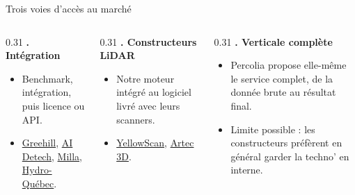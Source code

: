 \documentclass[A4,svgnames,10pt,aspectratio=169,usepdftitle=false]{beamer}
\begin{document}
\begin{frame}{Trois voies d'accès au marché}
    \begin{columns}[T]
        \begin{column}{0.31\textwidth}
            \textbf{. Intégration}
            \begin{itemize}
                \item Benchmark, intégration, puis licence ou API.
                \item \href{https://www.greehill.com/}{Greehill}, \href{https://www.linkedin.com/company/ai-detech}{AI Detech}, \href{https://www.milla-group.com/}{Milla}, \href{https://www.hydroquebec.com/}{Hydro-Québec}.
            \end{itemize}
        \end{column}

        \begin{column}{0.31\textwidth}
            \textbf{. Constructeurs LiDAR}
            \begin{itemize}
                \item Notre moteur intégré au logiciel livré avec leurs scanners.
                \item \href{https://www.yellowscan.com/}{YellowScan}, \href{https://www.artec3d.com/}{Artec 3D}.
            \end{itemize}
        \end{column}

        \begin{column}{0.31\textwidth}
            \textbf{. Verticale complète}
            \begin{itemize}
                \item Percolia propose elle-même le service complet, de la donnée brute au résultat final.
                \item Limite possible : les constructeurs préfèrent en général garder la techno' en interne.
            \end{itemize}
        \end{column}
    \end{columns}
\end{frame}
\end{document}
